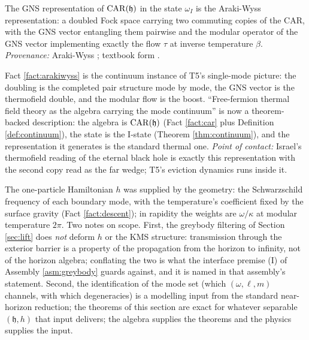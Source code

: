 \begin{fact}\label{fact:arakiwyss}
The GNS representation of $\mathrm{CAR}(\mathfrak{h})$ in the state $\omega_I$ is the Araki-Wyss representation: a doubled Fock space carrying two commuting copies of the CAR, with the GNS vector entangling them pairwise and the modular operator of the GNS vector implementing exactly the flow $\tau$ at inverse temperature $\beta$. \emph{Provenance:} Araki-Wyss \cite{ArakiWyss1964}; textbook form \cite[\S 5.3]{BratteliRobinson1997}.
\end{fact}

\begin{remark}\label{rem:tft}
Fact \ref{fact:arakiwyss} is the continuum instance of T5's single-mode picture: the doubling is the completed pair structure mode by mode, the GNS vector is the thermofield double, and the modular flow is the boost. ``Free-fermion thermal field theory as the algebra carrying the mode continuum'' is now a theorem-backed description: the algebra is $\mathrm{CAR}(\mathfrak{h})$ (Fact \ref{fact:car} plus Definition \ref{def:continuum}), the state is the I-state (Theorem \ref{thm:continuum}), and the representation it generates is the standard thermal one. \emph{Point of contact:} Israel's thermofield reading of the eternal black hole \cite{Israel1976} is exactly this representation with the second copy read as the far wedge; T5's eviction dynamics runs inside it.
\end{remark}

\begin{remark}\label{rem:whichdynamics}
The one-particle Hamiltonian $h$ was supplied by the geometry: the Schwarzschild frequency of each boundary mode, with the temperature's coefficient fixed by the surface gravity (Fact \ref{fact:descent}); in rapidity the weights are $\omega/\kappa$ at modular temperature $2\pi$. Two notes on scope. First, the greybody filtering of Section \ref{sec:lift} does \emph{not} deform $h$ or the KMS structure: transmission through the exterior barrier is a property of the propagation from the horizon to infinity, not of the horizon algebra; conflating the two is what the interface premise (I) of Assembly \ref{asm:greybody} guards against, and it is named in that assembly's statement. Second, the identification of the mode set (which $(\omega, \ell, m)$ channels, with which degeneracies) is a modelling input from the standard near-horizon reduction; the theorems of this section are exact for whatever separable $(\mathfrak{h}, h)$ that input delivers; the algebra supplies the theorems and the physics supplies the input.
\end{remark}


